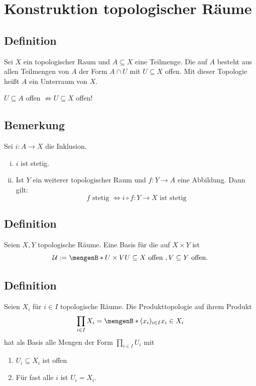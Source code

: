 \section{Konstruktion topologischer Räume} %
\label{sec:2}

\subsection[Definition: Spurtopologie]{Definition} %
\label{sub:21}
Sei $X$ ein topologischer Raum und $A \subseteq X$ eine Teilmenge. Die  auf $A$ besteht aus allen Teilmengen von $A$ der Form $A \cap U$ mit 
$U \subseteq X$ offen. Mit dieser Topologie heißt $A$ ein Unterraum von $X$.

 $U \subseteq A$ offen $\not\Rightarrow 	U \subseteq X$ offen!

\subsection[Bemerkung: Stetigkeit durch Verknüpfung mit Inklusion]{Bemerkung} %
\label{sub:22}
Sei $i : A \to X$ die Inklusion.
\begin{enumerate}[(i)]
	\item $i$ ist stetig.
	\item Ist $Y$ ein weiterer topologischer Raum und $f : Y \to A$ eine Abbildung. Dann gilt:
	\[
		f \text{ stetig } \iff i \circ  f : Y \to X \text{ ist stetig}
	\]
\end{enumerate}

\subsection[Definition: Produkttopologie]{Definition} %
\label{sub:23}
Seien $X,Y$ topologische Räume. Eine Basis für die  auf $X \times Y$ ist 
\[
	\mathcal{U} := \set[U \times V]{U \subseteq X \text{ offen }, V \subseteq Y \text{ offen}}. 
\]

\subsection[Definition: Produkttopologie mit unendlichen vielen Faktoren]{Definition} %
\label{sub:24}
Seien $X_i$ für $i \in I$ topologische Räume. Die Produkttopologie auf ihrem Produkt 
\[
	\prod_{i \in I} X_i = \set[(x_i)_{i \in I}]{x_i \in X_i} 
\]
hat als Basis alle Mengen der Form $\prod_{i \in I} U_i$ mit
\begin{enumerate}[1)]
	\item $U_i \subseteq X_i$ ist offen
	\item Für fast alle $i$ ist $U_i = X_i$.
\end{enumerate}


